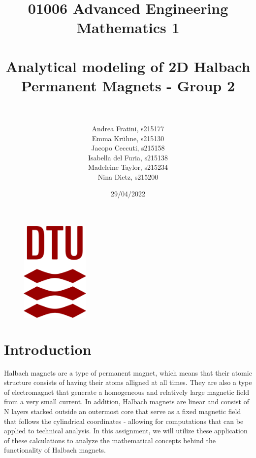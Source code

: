 \documentclass{article}
\begin{document}
\begin{titlepage}
\begin{figure}
\centering
\includegraphics[width=0.3\textwidth]{DTU.logo.png}
\end{figure}
\title{01006 Advanced Engineering Mathematics 1
\vspace{5}
\hline
\\ \vspace{5}
\\ \textbf{Analytical modeling of 2D Halbach Permanent
Magnets - Group 2 }
\\ \vspace{5}
\\ \hline
\vspace{30} } 


\author{\Large Andrea Fratini, s215177
\\\Large Emma Krühne, s215130
\\\Large Jacopo Ceccuti, s215158
\\\Large Isabella del Furia, s215138
\\\Large Madeleine Taylor, s215234
\\\Large Nina Dietz, s215200 \vspace{150}  }
\date{29/04/2022} 
\maketitle
\thispagestyle{empty}
\end{titlepage}
\setcounter{page}{1}

\pagebreak

\section{Introduction}
 Halbach magnets are a type of permanent magnet, which means that their atomic structure consists of having their atoms alligned at all times. They are also a type of electromagnet that generate a homogeneous and relatively large magnetic field from a very small current. In addition, Halbach magnets are linear and consist of N layers stacked outside an outermost core that serve as a fixed magnetic field that follows the cylindrical coordinates - allowing for computations that can be applied to technical analysis. In this assignment, we will utilize these application of these calculations to analyze the mathematical concepts behind the functionality of Halbach magnets.
\end{document}
